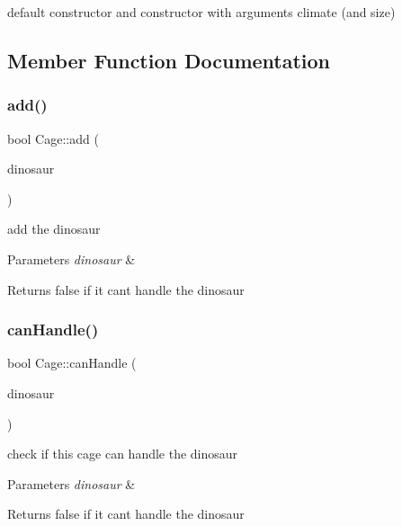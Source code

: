 default constructor and constructor with arguments climate (and size) 



\subsection{Member Function Documentation}
\mbox{\label{classCage_af02dee37ba338f304219806d52b93b02}} 
\subsubsection{\texorpdfstring{add()}{add()}}
{\footnotesize\ttfamily bool Cage\+::add (\begin{DoxyParamCaption}\item[{const \hyperlink{classDinosaur}{Dinosaur} \&}]{dinosaur }\end{DoxyParamCaption})}

add the dinosaur 
\begin{DoxyParams}{Parameters}
{\em dinosaur} & \\
\hline
\end{DoxyParams}
\begin{DoxyReturn}{Returns}
false if it can\textquotesingle{}t handle the dinosaur 
\end{DoxyReturn}
\mbox{\label{classCage_acfe1a0e71ede403be924d0f95dca9d6b}} 
\subsubsection{\texorpdfstring{can\+Handle()}{canHandle()}}
{\footnotesize\ttfamily bool Cage\+::can\+Handle (\begin{DoxyParamCaption}\item[{const \hyperlink{classDinosaur}{Dinosaur} \&}]{dinosaur }\end{DoxyParamCaption})}

check if this cage can handle the dinosaur 
\begin{DoxyParams}{Parameters}
{\em dinosaur} & \\
\hline
\end{DoxyParams}
\begin{DoxyReturn}{Returns}
false if it can\textquotesingle{}t handle the dinosaur 
\end{DoxyReturn}
\mbox{\label{classCage_a06119d2cf7fbff869584c09c5708d8a2}} 
